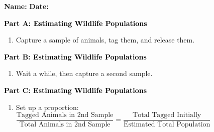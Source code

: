 \documentclass[12pt, letterpaper, fleqn]{article}
\begin{document}
\textbf{Name:} \underline{\hspace{5cm}}
\hfill
\textbf{Date:} \underline{\hspace{3cm}}\\

\begin{tcolorbox}[colback=customteal!20]
\large\textcolor{black}{\textbf{Part A: Estimating Wildlife Populations}}
\end{tcolorbox}

\vspace{3mm}

\begin{enumerate}[itemsep=5.5cm, leftmargin=0.6cm]
\item Capture a sample of animals, tag them, and release them.
\end{enumerate}

\newpage

\begin{tcolorbox}[colback=customteal!20]
\large\textcolor{black}{\textbf{Part B: Estimating Wildlife Populations}}
\end{tcolorbox}

\vspace{3mm}

\begin{enumerate}[itemsep=5.5cm, leftmargin=0.6cm, resume]
\item Wait a while, then capture a second sample.
\end{enumerate}

\newpage

\begin{tcolorbox}[colback=customteal!20]
\large\textcolor{black}{\textbf{Part C: Estimating Wildlife Populations}}
\end{tcolorbox}

\vspace{3mm}

\begin{enumerate}[itemsep=5.5cm, leftmargin=0.6cm, resume]
\item Set up a proportion: $\dfrac{\text{Tagged Animals in 2nd Sample}}{\text{Total Animals in 2nd Sample}} = \dfrac{\text{Total Tagged Initially}}{\text{Estimated Total Population}}$
\end{enumerate}

\newpage
\end{document}
